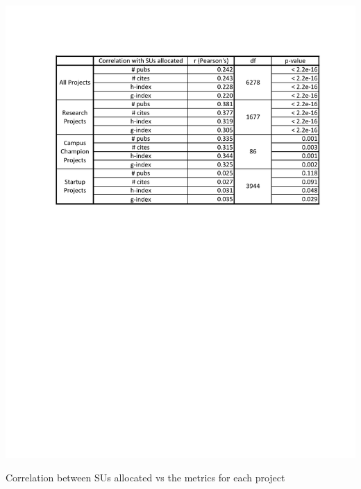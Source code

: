 

\begin{table}[htb]
  \centering
    \includegraphics[width=1.0\columnwidth]{images/metrics_alloc_r.pdf}
  \caption{Correlation between SUs allocated vs the metrics for each project}\label{F:metrics-alloc-r}
\end{table}

